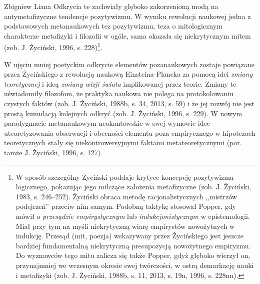 \begin{artplenv}{Zbigniew Liana}
Odkrycia te zachwiały głęboko zakorzenioną modą na antymetafizyczne tendencje pozytywizmu. W wyniku rewolucji naukowej
jedna z podstawowych metanaukowych tez pozytywizmu, teza o mitologicznym charakterze metafizyki i filozofii w ogóle,
sama okazała się niekrytycznym mitem \label{ref:RNDw5Xs923WOa}(zob. J. Życiński, 1996, s. 228)\footnote{W sposób
	szczególny Życiński poddaje krytyce koncepcję pozytywizmu logicznego, pokazując jego milczące założenia metafizyczne
	\label{ref:RNDk96fcXirdq}(zob. J. Życiński, 1983, s. 246–252). Życiński obraca metodę racjonalistycznych ,,mistrzów
	podejrzeń'' przeciw nim samym. Podobną taktykę stosował Popper, gdy mówił o \textit{przesądzie empirystycznym} lub
	\textit{indukcjonistycznym} w epistemologii. Miał przy tym na myśli niekrytyczną wiarę empirystów nowożytnych w indukcję.
	Przesąd (mit, poezja) wskazywany przez Życińskiego jest jeszcze bardziej fundamentalną niekrytyczną presupozycją
	nowożytnego empiryzmu. Do wyznawców tego mitu zalicza się także Popper, gdyż głęboko wierzył on, przynajmniej we
	wczesnym okresie swej twórczości, w ostrą demarkację nauki i metafizyki \label{ref:RNDdtZAuOTDND}(zob. J. Życiński,
	1988b, s. 11, 2013, s. 19n, 1996, s. 228nn). }.

W ujęciu mniej poetyckim odkrycie elementów pozanaukowych zostaje powiązane przez Życińskiego z rewolucją naukową
Einsteina-Plancka za pomocą idei \textit{zmiany teoretycznej} i ideą \textit{zmiany wizji świata} implikowanej przez
teorie. Zmiany te uświadomiły filozofom, że praktyka naukowa nie polega na protokołowaniu czystych faktów
\label{ref:RNDi0g21xRjLd}(zob. J. Życiński, 1988b, s. 34, 2013, s. 59) i że jej rozwój nie jest prostą kumulacją
kolejnych odkryć \label{ref:RNDl7y894RdpX}(zob. J. Życiński, 1996, s. 229). W nowym paradygmacie metanaukowym
neokantowskie w swej wymowie idee uteoretyzowania obserwacji i obecności elementu poza-empirycznego w hipotezach
teoretycznych stały się niekontrowersyjnymi faktami metateoretycznymi \label{ref:RNDLhcTxbq259}(por. tamże J. Życiński,
1996, s. 127).


\end{artplenv}
